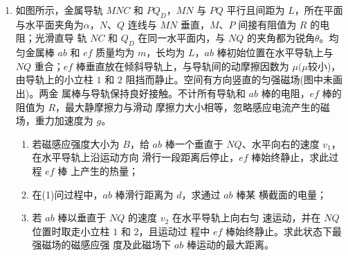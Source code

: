 \begin{enumerate}




\item 
{}
如图所示，金属导轨 $ MNC $ 和 $ P Q_{D} $，$ MN $ 与 $ PQ $ 平行且间距为
$ L $，所在平面与水平面夹角为$ \alpha $，$ N $、$ Q $ 连线与 $ MN $ 垂直，$ M $、$ P $ 间接有阻值为 $ R $ 的电阻；光滑直导
轨 $ NC $ 和 $ Q_{D} $ 在同一水平面内，与 $ NQ $ 的夹角都为锐角$ \theta $。均匀金属棒 $ ab $ 和 $ ef $ 质量均为 $ m $，长均为
$ L $，$ ab $ 棒初始位置在水平导轨上与 $ NQ $ 重合；$ ef $ 棒垂直放在倾斜导轨上，与导轨间的动摩擦因数为
$ \mu ( \mu $较小)，由导轨上的小立柱 $ 1 $ 和 $ 2 $ 阻挡而静止。空间有方向竖直的匀强磁场(图中未画出)。两金
属棒与导轨保持良好接触。不计所有导轨和 $ ab $ 棒的电阻，$ ef $ 棒的阻值为 $ R $，最大静摩擦力与滑动
摩擦力大小相等，忽略感应电流产生的磁场，重力加速度为 $ g $。
\begin{enumerate}
\item
若磁感应强度大小为 $ B $，给 $ ab $ 棒一个垂直于 $ NQ $、水平向右的速度 $ v_{1} $，在水平导轨上沿运动方向
滑行一段距离后停止，$ ef $ 棒始终静止，求此过程 $ ef $ 棒
上产生的热量；

\item 
在(1)问过程中，$ ab $ 棒滑行距离为 $ d $，求通过 $ ab $ 棒某
横截面的电量；



\item 
若 $ ab $ 棒以垂直于 $ NQ $ 的速度 $ v_{2} $ 在水平导轨上向右匀
速运动，并在 $ NQ $ 位置时取走小立柱 $ 1 $ 和 $ 2 $，且运动过
程中 $ ef $ 棒始终静止。求此状态下最强磁场的磁感应强
度及此磁场下 $ ab $ 棒运动的最大距离。



\end{enumerate}
\begin{figure}[h!]
\flushright

\end{figure}



\end{enumerate}
